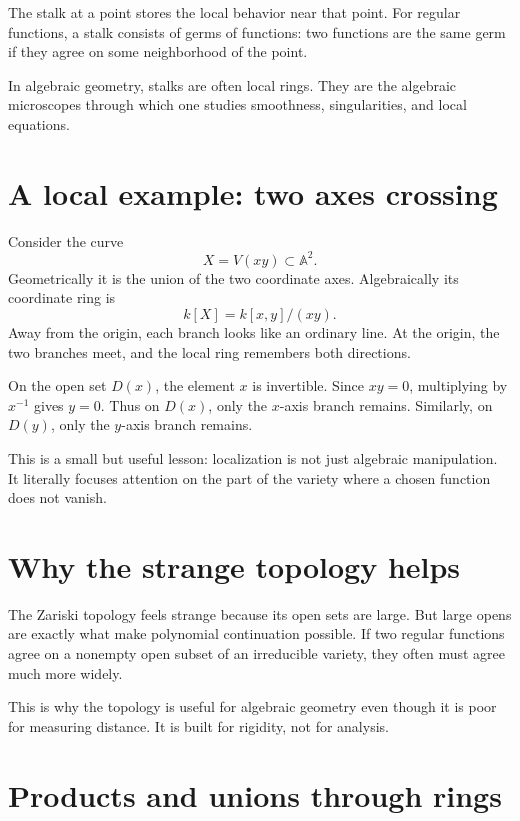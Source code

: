 The stalk at a point stores the local behavior near that point. For regular functions, a stalk consists of germs of functions: two functions are the same germ if they agree on some neighborhood of the point.

In algebraic geometry, stalks are often local rings. They are the algebraic microscopes through which one studies smoothness, singularities, and local equations.


\section{A local example: two axes crossing}

Consider the curve
\[
  X=V(xy)\subset\mathbb A^2.
\]
Geometrically it is the union of the two coordinate axes.  Algebraically its coordinate ring is
\[
  k[X]=k[x,y]/(xy).
\]
Away from the origin, each branch looks like an ordinary line.  At the origin, the two branches meet, and the local ring remembers both directions.

On the open set \(D(x)\), the element \(x\) is invertible.  Since \(xy=0\), multiplying by \(x^{-1}\) gives \(y=0\).  Thus on \(D(x)\), only the \(x\)-axis branch remains.  Similarly, on \(D(y)\), only the \(y\)-axis branch remains.

This is a small but useful lesson: localization is not just algebraic manipulation.  It literally focuses attention on the part of the variety where a chosen function does not vanish.

\section{Why the strange topology helps}

The Zariski topology feels strange because its open sets are large.  But large opens are exactly what make polynomial continuation possible.  If two regular functions agree on a nonempty open subset of an irreducible variety, they often must agree much more widely.

This is why the topology is useful for algebraic geometry even though it is poor for measuring distance.  It is built for rigidity, not for analysis.


\section{Products and unions through rings}

